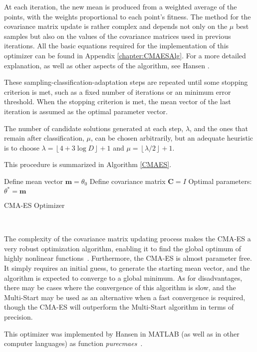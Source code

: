 At each iteration, the new mean is produced from a weighted average of the points, with the weights proportional to each point's fitness.
The method for the covariance matrix update is rather complex and depends not only on the $\mu$ best samples but also on the values of the covariance matrices used in previous iterations. All the basic equations required for the implementation of this optimizer can be found in Appendix \ref{chapter:CMAESAlg}. For a more detailed explanation, as well as other aspects of the algorithm, see Hansen \cite{Hansen}.

These sampling-classification-adaptation steps are repeated until some stopping criterion is met, such as a fixed number of iterations or an minimum error threshold.
When the stopping criterion is met, the mean vector of the last iteration is assumed as the optimal parameter vector.


The number of candidate solutions generated at each step, $\lambda$, and the ones that remain after classification, $\mu$, can be chosen arbitrarily, but an adequate heuristic is to choose $\lambda=\left\lfloor4+3\log D\right\rfloor+1$ and $\mu=\left\lfloor\lambda/2\right\rfloor+1$.

This procedure is summarized in Algorithm \ref{CMAES}.

\begin{algorithm}[H]\label{CMAES}
\DontPrintSemicolon
Define mean vector $\mathbf{m}=\theta_0$
Define covariance matrix $\mathbf{C}=I$\;
 Optimal parameters: $\theta^{*}=\mathbf{m}$\;
 \caption{CMA-ES Optimizer}
\end{algorithm}
\

The complexity of the covariance matrix updating process makes the CMA-ES a very robust optimization algorithm, enabling it to find the global optimum of highly nonlinear functions~\cite{DilaoCMA}.
Furthermore, the CMA-ES is almost parameter free. It simply requires an initial guess, to generate the starting mean vector, and the algorithm is expected to converge to a global minimum.
As for disadvantages, there may be cases where the convergence of this algorithm is slow, and the Multi-Start may be used as an alternative when a fast convergence is required, though the CMA-ES will outperform the Multi-Start algorithm in terms of precision.

This optimizer was implemented by Hansen in MATLAB (as well as in other computer languages) as function \emph{purecmaes}~\cite{CMAES}.

